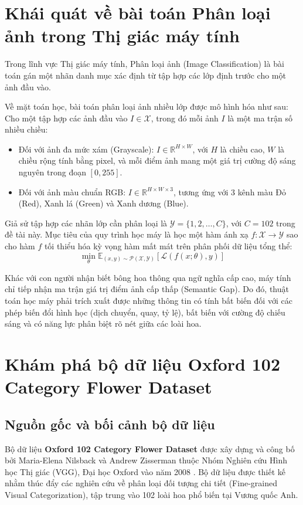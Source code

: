 \documentclass[../DoAn.tex]{subfiles}
\begin{document}
\section{Khái quát về bài toán Phân loại ảnh trong Thị giác máy tính}
Trong lĩnh vực Thị giác máy tính, Phân loại ảnh (Image Classification) là bài toán gán một nhãn danh mục xác định từ tập hợp các lớp định trước cho một ảnh đầu vào.

Về mặt toán học, bài toán phân loại ảnh nhiều lớp được mô hình hóa như sau:
Cho một tập hợp các ảnh đầu vào $I \in \mathcal{X}$, trong đó mỗi ảnh $I$ là một ma trận số nhiều chiều:
\begin{itemize}
    \item Đối với ảnh đa mức xám (Grayscale): $I \in \mathbb{R}^{H \times W}$, với $H$ là chiều cao, $W$ là chiều rộng tính bằng pixel, và mỗi điểm ảnh mang một giá trị cường độ sáng nguyên trong đoạn $[0, 255]$.
    \item Đối với ảnh màu chuẩn RGB: $I \in \mathbb{R}^{H \times W \times 3}$, tương ứng với 3 kênh màu Đỏ (Red), Xanh lá (Green) và Xanh dương (Blue).
\end{itemize}

Giả sử tập hợp các nhãn lớp cần phân loại là $\mathcal{Y} = \{1, 2, \dots, C\}$, với $C = 102$ trong đề tài này.
Mục tiêu của quy trình học máy là học một hàm ánh xạ $f: \mathcal{X} \rightarrow \mathcal{Y}$ sao cho hàm $f$ tối thiểu hóa kỳ vọng hàm mất mát trên phân phối dữ liệu tổng thể:
\begin{equation}
    \min_{\theta} \mathbb{E}_{(x, y) \sim \mathcal{P}(\mathcal{X}, \mathcal{Y})} [ \mathcal{L}(f(x; \theta), y) ]
\end{equation}

Khác với con người nhận biết bông hoa thông qua ngữ nghĩa cấp cao, máy tính chỉ tiếp nhận ma trận giá trị điểm ảnh cấp thấp (Semantic Gap). Do đó, thuật toán học máy phải trích xuất được những thông tin có tính bất biến đối với các phép biến đổi hình học (dịch chuyển, quay, tỷ lệ), bất biến với cường độ chiếu sáng và có năng lực phân biệt rõ nét giữa các loài hoa.

\section{Khám phá bộ dữ liệu Oxford 102 Category Flower Dataset}
\subsection{Nguồn gốc và bối cảnh bộ dữ liệu}
Bộ dữ liệu \textbf{Oxford 102 Category Flower Dataset} được xây dựng và công bố bởi Maria-Elena Nilsback và Andrew Zisserman thuộc Nhóm Nghiên cứu Hình học Thị giác (VGG), Đại học Oxford vào năm 2008 \cite{nilsback2008automated, oxfordflowers102}. Bộ dữ liệu được thiết kế nhằm thúc đẩy các nghiên cứu về phân loại đối tượng chi tiết (Fine-grained Visual Categorization), tập trung vào 102 loài hoa phổ biến tại Vương quốc Anh.
\end{document}

